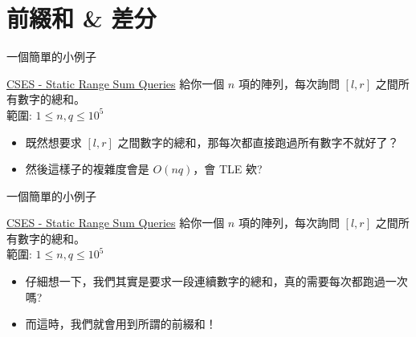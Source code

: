 \documentclass[aspectratio=169]{beamer}
\begin{document}
    \section{前綴和 \& 差分}
    
    \begin{frame}{一個簡單的小例子}
        \begin{block}{\href{https://cses.fi/problemset/task/1646}{CSES - Static Range Sum Queries}}
            給你一個 $n$ 項的陣列，每次詢問 $[l,r]$ 之間所有數字的總和。 \\
            \vspace{5mm}
            範圍: $1 \le n,q \le 10^5$
        \end{block}
        \begin{itemize}
            \item 既然想要求 $[l,r]$ 之間數字的總和，那每次都直接跑過所有數字不就好了？
            \item<2-> 然後這樣子的複雜度會是 $O(nq)$，會 TLE 欸?
        \end{itemize}
    \end{frame}
    
    \begin{frame}{一個簡單的小例子}
        \begin{block}{\href{https://cses.fi/problemset/task/1646}{CSES - Static Range Sum Queries}}
            給你一個 $n$ 項的陣列，每次詢問 $[l,r]$ 之間所有數字的總和。 \\
            \vspace{5mm}
            範圍: $1 \le n,q \le 10^5$
        \end{block}
        \begin{itemize}
            \item 仔細想一下，我們其實是要求一段連續數字的總和，真的需要每次都跑過一次嗎?
            \item<2-> 而這時，我們就會用到所謂的前綴和！
        \end{itemize}
    \end{frame}
    
\end{document}
